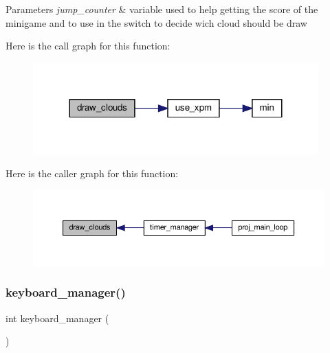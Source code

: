 \begin{DoxyParams}{Parameters}
{\em jump\+\_\+counter} & variable used to help getting the score of the minigame and to use in the switch to decide wich cloud should be draw \\
\hline
\end{DoxyParams}
Here is the call graph for this function\+:
\nopagebreak
\begin{figure}[H]
\begin{center}
\leavevmode
\includegraphics[width=311pt]{group__main__functions_ga527ecae69a4a84b54c2c1e0fdfb4b72d_cgraph}
\end{center}
\end{figure}
Here is the caller graph for this function\+:
\nopagebreak
\begin{figure}[H]
\begin{center}
\leavevmode
\includegraphics[width=350pt]{group__main__functions_ga527ecae69a4a84b54c2c1e0fdfb4b72d_icgraph}
\end{center}
\end{figure}
\mbox{\label{group__main__functions_gaaf064e0d3192ae8797d78dcb08bc838e}} 
\subsubsection{\texorpdfstring{keyboard\+\_\+manager()}{keyboard\_manager()}}
{\footnotesize\ttfamily int keyboard\+\_\+manager (\begin{DoxyParamCaption}{ }\end{DoxyParamCaption})}



